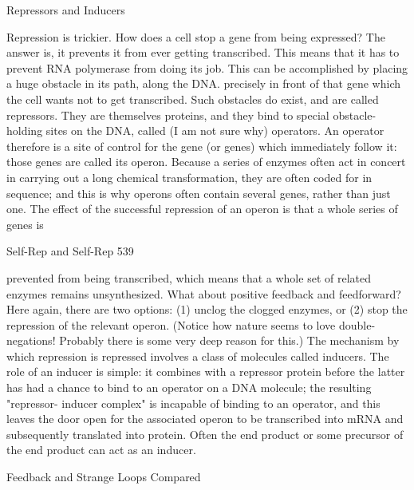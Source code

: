 {                                  Repressors and Inducers

Repression is trickier. How does a cell stop a gene from being expressed? The answer is, it
prevents it from ever getting transcribed. This means that it has to prevent RNA polymerase
from doing its job. This can be accomplished by placing a huge obstacle in its path, along the
DNA. precisely in front of that gene which the cell wants not to get transcribed. Such
obstacles do exist, and are called repressors. They are themselves proteins, and they bind to
special obstacle-holding sites on the DNA, called (I am not sure why) operators. An operator
therefore is a site of control for the gene (or genes) which immediately follow it: those genes
are called its operon. Because a series of enzymes often act in concert in carrying out a long
chemical transformation, they are often coded for in sequence; and this is why operons often
contain several genes, rather than just one. The effect of the successful repression of an
operon is that a whole series of genes is




Self-Rep and Self-Rep                                                                       539

prevented from being transcribed, which means that a whole set of related enzymes remains
unsynthesized.
         What about positive feedback and feedforward? Here again, there are two options: (1)
unclog the clogged enzymes, or (2) stop the repression of the relevant operon. (Notice how
nature seems to love double-negations! Probably there is some very deep reason for this.)
The mechanism by which repression is repressed involves a class of molecules called
inducers. The role of an inducer is simple: it combines with a repressor protein before the
latter has had a chance to bind to an operator on a DNA molecule; the resulting "repressor-
inducer complex" is incapable of binding to an operator, and this leaves the door open for the
associated operon to be transcribed into mRNA and subsequently translated into protein.
Often the end product or some precursor of the end product can act as an
inducer.

                         Feedback and Strange Loops Compared

}
